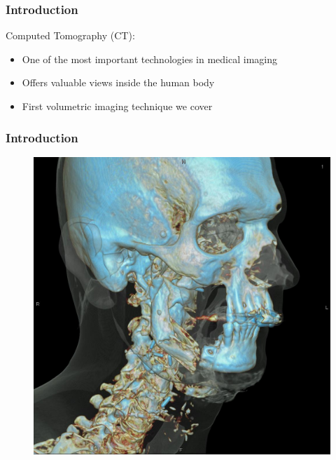 \begin{frame}
	\frametitle{Introduction}

	Computed Tomography (CT):
	\begin{itemize}
		\item One of the most important technologies in medical imaging
		\item Offers valuable views inside the human body
		\item First volumetric imaging technique we cover
	\end{itemize}

\end{frame}
\begin{frame}

	\frametitle{Introduction}

	\begin{figure}[tb]
		\centering
		\begin{minipage}{.45\linewidth}
			\centering
			\includegraphics[width=0.85\linewidth]{images/head_vrt}
			\label{fig:ct_intro_1}
		\end{minipage}%
		\begin{minipage}{.45\linewidth}
			\centering

\end{minipage}
\end{figure}
\end{frame}
